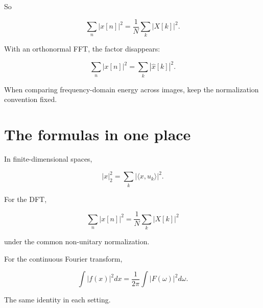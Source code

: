 So

\[
\sum_n |x[n]|^2
=
\frac{1}{N}
\sum_k |X[k]|^2.
\]

With an orthonormal FFT, the factor disappears:

\[
\sum_n |x[n]|^2
=
\sum_k |\widehat{x}[k]|^2.
\]

When comparing frequency-domain energy across images, keep the normalization convention fixed.

\section{The formulas in one place}

In finite-dimensional spaces,

\[
|x|_2^2
=
\sum_k
|\langle x,u_k\rangle|^2.
\]

For the DFT,

\[
\sum_n |x[n]|^2
=
\frac{1}{N}
\sum_k |X[k]|^2
\]

under the common non-unitary normalization.

For the continuous Fourier transform,

\[
\int |f(x)|^2dx
=
\frac{1}{2\pi}
\int |F(\omega)|^2d\omega.
\]

The same identity in each setting.
